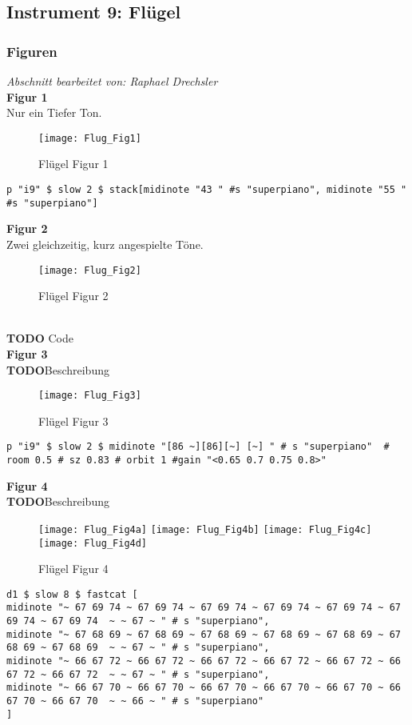 \documentclass[
10pt, %
a4paper, %
oneside, %
headinclude,footinclude, %
BCOR5mm, %
]{scrartcl}
\begin{document}
\subsection{Instrument 9: Flügel}
\subsubsection{Figuren}
\textit{Abschnitt bearbeitet von: Raphael Drechsler}\\

\noindent\textbf{Figur 1}\\
Nur ein Tiefer Ton.
\begin{figure}[h]
	\centering 
	\texttt{[image: Flug\_Fig1]} 
	\caption{Flügel Figur 1}
\end{figure}

\begin{lstlisting}
p "i9" $ slow 2 $ stack[midinote "43 " #s "superpiano", midinote "55 " #s "superpiano"]
\end{lstlisting}

\noindent \textbf{Figur 2}\\
Zwei gleichzeitig, kurz angespielte Töne.
\begin{figure}[h]
	\centering 
	\texttt{[image: Flug\_Fig2]} 
	\caption{Flügel Figur 2}
\end{figure}\\
{\color{red}\textbf{TODO}} Code\\


\noindent \textbf{Figur 3}\\
{\color{red}\textbf{TODO}}Beschreibung\\
\begin{figure}[h]
	\centering 
	\texttt{[image: Flug\_Fig3]} 
	\caption{Flügel Figur 3}
\end{figure}
\begin{lstlisting}
p "i9" $ slow 2 $ midinote "[86 ~][86][~] [~] " # s "superpiano"  # room 0.5 # sz 0.83 # orbit 1 #gain "<0.65 0.7 0.75 0.8>"
\end{lstlisting}


\noindent \textbf{Figur 4}\\
{\color{red}\textbf{TODO}}Beschreibung\\
\begin{figure}[h]
	\centering 
	\texttt{[image: Flug\_Fig4a]} 
	\texttt{[image: Flug\_Fig4b]} 
	\texttt{[image: Flug\_Fig4c]} 
	\texttt{[image: Flug\_Fig4d]} 
	\caption{Flügel Figur 4}
\end{figure}
\begin{lstlisting}
d1 $ slow 8 $ fastcat [
midinote "~ 67 69 74 ~ 67 69 74 ~ 67 69 74 ~ 67 69 74 ~ 67 69 74 ~ 67 69 74 ~ 67 69 74  ~ ~ 67 ~ " # s "superpiano",
midinote "~ 67 68 69 ~ 67 68 69 ~ 67 68 69 ~ 67 68 69 ~ 67 68 69 ~ 67 68 69 ~ 67 68 69  ~ ~ 67 ~ " # s "superpiano",
midinote "~ 66 67 72 ~ 66 67 72 ~ 66 67 72 ~ 66 67 72 ~ 66 67 72 ~ 66 67 72 ~ 66 67 72  ~ ~ 67 ~ " # s "superpiano",
midinote "~ 66 67 70 ~ 66 67 70 ~ 66 67 70 ~ 66 67 70 ~ 66 67 70 ~ 66 67 70 ~ 66 67 70  ~ ~ 66 ~ " # s "superpiano"
]
\end{lstlisting}
\end{document}
